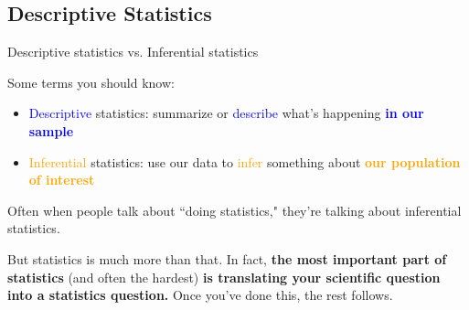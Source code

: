 \documentclass[10pt,t]{beamer}
\begin{document}
\subsection{Descriptive Statistics}

\begin{frame}{Descriptive statistics vs. Inferential statistics}

	Some terms you should know:
	
	\vspace{0.3cm}
	
	\begin{itemize}
		\item \textcolor{blue}{Descriptive} statistics: summarize or \textcolor{blue}{describe} what's happening \textcolor{blue}{\textbf{in our sample}}
		\item \textcolor{orange}{Inferential} statistics: use our data to \textcolor{orange}{infer} something about \textcolor{orange}{\textbf{our population of interest}}
	\end{itemize}
	
	\vspace{0.3cm}
	
	Often when people talk about ``doing statistics," they're talking about inferential statistics.
	
	\vspace{0.3cm}
	
	But statistics is much more than that. In fact, \textbf{the most important part of statistics} (and often the hardest) \textbf{is translating your scientific question into a statistics question.} Once you've done this, the rest follows.
	
\end{frame}
\end{document}
